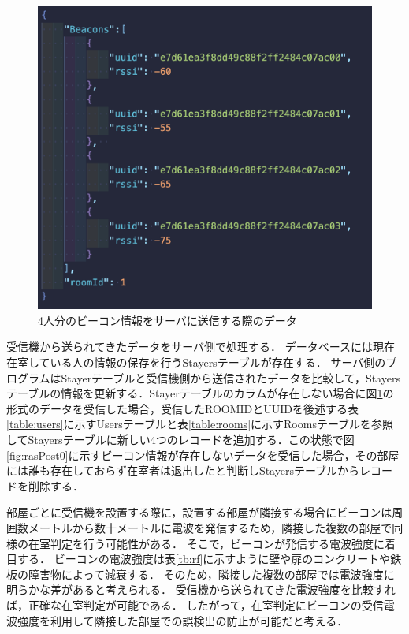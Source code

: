 \begin{figure}[H]
  \begin{center}
    \includegraphics[width=160mm]{image/rasPost4.png}
    \caption{4人分のビーコン情報をサーバに送信する際のデータ}
    \label{fig:rasPost4}
  \end{center}
\end{figure}

受信機から送られてきたデータをサーバ側で処理する．
データベースには現在在室している人の情報の保存を行うStayersテーブルが存在する．
サーバ側のプログラムはStayerテーブルと受信機側から送信されたデータを比較して，Stayersテーブルの情報を更新する．Stayerテーブルのカラムが存在しない場合に図\ref{fig:rasPost4}の形式のデータを受信した場合，受信したROOMIDとUUIDを後述する表\ref{table:users}に示すUsersテーブルと表\ref{table:rooms}に示すRoomsテーブルを参照してStayersテーブルに新しい4つのレコードを追加する．この状態で図\ref{fig:rasPost0}に示すビーコン情報が存在しないデータを受信した場合，その部屋には誰も存在しておらず在室者は退出したと判断しStayersテーブルからレコードを削除する．

部屋ごとに受信機を設置する際に，設置する部屋が隣接する場合にビーコンは周囲数メートルから数十メートルに電波を発信するため，隣接した複数の部屋で同様の在室判定を行う可能性がある．
そこで，ビーコンが発信する電波強度に着目する．
ビーコンの電波強度は表\ref{tb:rf}に示すように壁や扉のコンクリートや鉄板の障害物によって減衰する\cite{barrier}．
そのため，隣接した複数の部屋では電波強度に明らかな差があると考えられる．
受信機から送られてきた電波強度を比較すれば，正確な在室判定が可能である．
したがって，在室判定にビーコンの受信電波強度を利用して隣接した部屋での誤検出の防止が可能だと考える．

